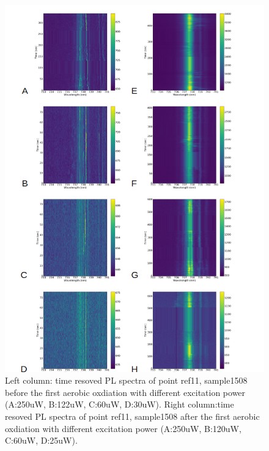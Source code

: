 \begin{figure}[h]
\centering
\includegraphics[width=1\linewidth]{Figures/pic/powerdependenceref11}
\caption{Left column: time resoved PL spectra of point ref11, sample1508 before the first aerobic oxdiation with different excitation power (A:250uW, B:122uW, C:60uW, D:30uW). Right column:time resoved PL spectra of point ref11, sample1508 after the first aerobic oxdiation with different excitation power (A:250uW, B:120uW, C:60uW, D:25uW).}
\label{fig:powerdependenceref11}
\end{figure}
